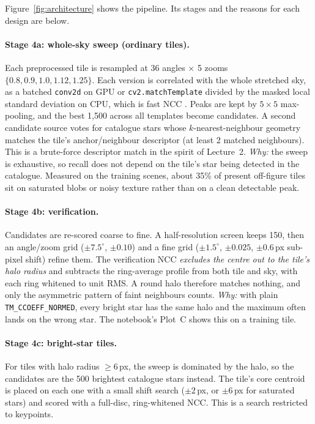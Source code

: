 \documentclass[a4paper,11pt]{article}
\begin{document}
Figure~\ref{fig:architecture} shows the pipeline. Its stages and the reasons for each design are below.

\paragraph{Stage 4a: whole-sky sweep (ordinary tiles).} Each preprocessed tile is resampled at 36 angles
$\times$ 5 zooms $\{0.8, 0.9, 1.0, 1.12, 1.25\}$. Each version is correlated with the whole stretched sky, as a batched
\texttt{conv2d} on GPU or \texttt{cv2.matchTemplate} divided by the masked local standard deviation on CPU, which is
fast NCC \parencite{lewis1995fast}. Peaks are kept by $5\times5$ max-pooling, and the best 1,500 across all templates become
candidates. A second candidate source votes for catalogue stars whose $k$-nearest-neighbour geometry matches the
tile's anchor/neighbour descriptor (at least 2 matched neighbours). This is a brute-force descriptor match in the
spirit of Lecture~2. \emph{Why:} the sweep is exhaustive, so recall does not depend on the tile's star being detected in the
catalogue. Measured on the training scenes, about 35\% of present off-figure tiles sit on saturated blobs or noisy
texture rather than on a clean detectable peak.

\paragraph{Stage 4b: verification.} Candidates are re-scored coarse to fine. A half-resolution screen keeps 150, then an
angle/zoom grid ($\pm7.5^\circ$, $\pm0.10$) and a fine grid ($\pm1.5^\circ$, $\pm0.025$, $\pm0.6$\,px sub-pixel shift)
refine them. The verification NCC \emph{excludes the centre out to the tile's halo radius} and subtracts the ring-average
profile from both tile and sky, with each ring whitened to unit RMS. A round halo therefore matches nothing, and only
the asymmetric pattern of faint neighbours counts. \emph{Why:} with plain \texttt{TM\_CCOEFF\_NORMED}, every bright star
has the same halo and the maximum often lands on the wrong star. The notebook's Plot~C shows this on a training tile.

\paragraph{Stage 4c: bright-star tiles.} For tiles with halo radius $\geq6$\,px, the sweep is dominated by the halo, so
the candidates are the 500 brightest catalogue stars instead. The tile's core centroid is placed on each one with a
small shift search ($\pm2$\,px, or $\pm6$\,px for saturated stars) and scored with a full-disc, ring-whitened NCC. This
is a search restricted to keypoints.
\end{document}
